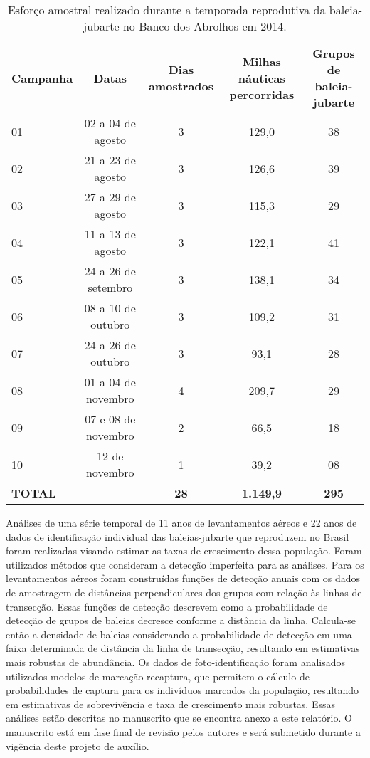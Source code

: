 \begin{table}
  \label{tab:baleia1}    
\caption{Esforço amostral realizado durante a temporada reprodutiva da baleia-jubarte no Banco dos Abrolhos em 2014.}
  \begin{tabular}{lcccc}  
    \textbf{Campanha} & \textbf{Datas} & \textbf{Dias amostrados} & \textbf{Milhas náuticas percorridas} & \textbf{Grupos de baleia-jubarte} \\
    01 & 02 a 04 de agosto & 3 & 129,0 & 38 \\
    02 & 21 a 23 de agosto & 3 & 126,6 & 39 \\
    03 & 27 a 29 de agosto & 3 & 115,3 & 29 \\
    04 & 11 a 13 de agosto & 3 & 122,1 & 41 \\
    05 & 24 a 26 de setembro & 3 & 138,1 & 34 \\
    06 & 08 a 10 de outubro & 3 & 109,2 & 31 \\
    07 & 24 a 26 de outubro & 3 & 93,1 & 28 \\
    08 & 01 a 04 de novembro & 4 & 209,7 & 29 \\
    09 & 07 e 08 de novembro & 2 & 66,5 & 18 \\
    10 & 12 de novembro & 1 & 39,2 & 08 \\
    \textbf{TOTAL} & & \textbf{28} & \textbf{1.149,9} & \textbf{295} \\
  \end{tabular}
\end{table}

Análises de uma série temporal de 11 anos de levantamentos aéreos e 22
anos de dados de identificação individual das baleias-jubarte que
reproduzem no Brasil foram realizadas visando estimar as taxas de
crescimento dessa população. Foram utilizados métodos que consideram a
detecção imperfeita para as análises. Para os levantamentos aéreos
foram construídas funções de detecção anuais com os dados de
amostragem de distâncias perpendiculares dos grupos com relação às
linhas de transecção. Essas funções de detecção descrevem como a
probabilidade de detecção de grupos de baleias decresce conforme a
distância da linha. Calcula-se então a densidade de baleias
considerando a probabilidade de detecção em uma faixa determinada de
distância da linha de transecção, resultando em estimativas mais
robustas de abundância. Os dados de foto-identificação foram
analisados utilizados modelos de marcação-recaptura, que permitem o
cálculo de probabilidades de captura para os indivíduos marcados da
população, resultando em estimativas de sobrevivência e taxa de
crescimento mais robustas. Essas análises estão descritas no
manuscrito que se encontra anexo a este relatório. O manuscrito está
em fase final de revisão pelos autores e será submetido durante a
vigência deste projeto de auxílio.